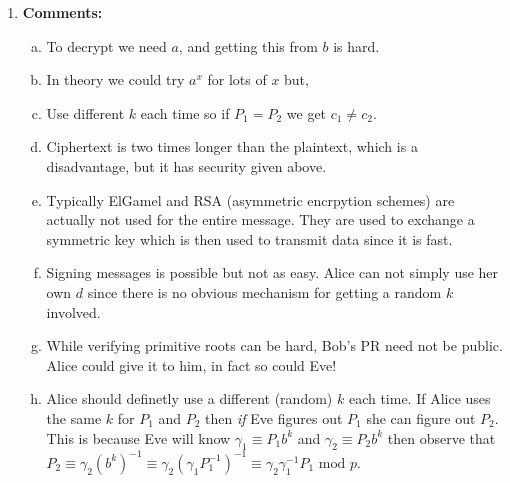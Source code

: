 \documentclass[class=article, crop=false]{standalone}
\begin{document}
\begin{enumerate}
	\item \textbf{Comments:}
	\begin{enumerate}[(a)]
		\item To decrypt we need $a$, and getting this from $b$ is hard.
		\item In theory we could try $a^x$ for lots of $x$ but,
		\item Use different $k$ each time so if $P_1 = P_2$ we get $c_1\neq c_2$.
		\item Ciphertext is two times longer than the plaintext, which is a disadvantage,
		but it has security given above.
		\item Typically ElGamel and RSA (asymmetric encrpytion schemes) are actually not used for the entire message.
		They are used to exchange a symmetric key which is then used to transmit data since
		it is fast.
		\item Signing messages is possible but not as easy. Alice can not simply use her own $d$
		since there is no obvious mechanism for getting a random $k$ involved.
		\item While verifying primitive roots can be hard, Bob's PR need not be public.
		Alice could give it to him, in fact so could Eve!
		\item Alice should definetly use a different (random) $k$ each time.
		If Alice uses the same $k$ for $P_1$ and $P_2$ then \textit{if} Eve figures out $P_1$
		she can figure out $P_2$. This is because Eve will know
		$\gamma_1\equiv P_1b^k$ and $\gamma_2\equiv P_2b^k$ then observe that
		$P_2\equiv \gamma_2(b^k)^{-1}\equiv \gamma_2\left(\gamma_1 P_1^{-1}\right)^{-1}
		\equiv \gamma_2\gamma_1^{-1}P_1\mbox{ mod }p$.
	\end{enumerate}

\end{enumerate}

\end{document}
